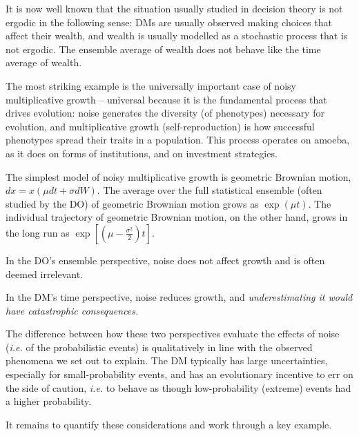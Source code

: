 \documentclass[11pt]{article}
\newcommand{\ie}{{\it i.e.}\xspace}
\numberwithin{equation}{section}
\begin{document}
It is now well known that the situation usually studied in decision theory is not ergodic in the following sense: DMs are usually observed making choices that affect their wealth, and wealth is usually modelled as a stochastic process that is not ergodic. The ensemble average of wealth does not behave like the time average of wealth.

The most striking example is the universally important case of noisy multiplicative growth -- universal because it is the fundamental process that drives evolution: noise generates the diversity (of phenotypes) necessary for evolution, and multiplicative growth (self-reproduction) is how successful phenotypes spread their traits in a population. This process operates on amoeba, as it does on forms of institutions, and on investment strategies. 

The simplest model of noisy multiplicative growth is geometric Brownian motion, $dx=x(\mu dt+\sigma dW)$. The average over the full statistical ensemble (often studied by the DO) of geometric Brownian motion grows as $\exp(\mu t)$. The individual trajectory of geometric Brownian motion, on the other hand, grows in the long run as $\exp[(\mu-\frac{\sigma^2}{2})t]$.

In the DO's ensemble perspective, noise does not affect growth and is often deemed irrelevant.

In the DM's time perspective, noise reduces growth, and {\it underestimating it would have catastrophic consequences.}

The difference between how these two perspectives evaluate the effects of noise (\ie of the probabilistic events) is qualitatively in line with the observed phenomena we set out to explain. The DM typically has large uncertainties, especially for small-probability events, and has an evolutionary incentive to err on the side of caution, \ie to behave as though low-probability (extreme) events had a higher probability.

It remains to quantify these considerations and work through a key example.
\end{document}
